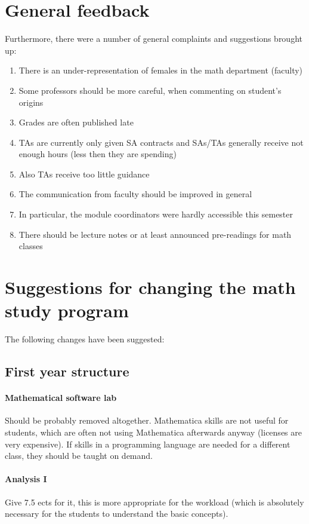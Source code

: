 \section{General feedback}
\label{sec-2}
\label{subsec:gen}
Furthermore, there were a number of general complaints and suggestions brought up:
\begin{enumerate}
\item There is an under-representation of females in the math department (faculty)
\item Some professors should be more careful, when commenting on student's origins
\item Grades are often published late
\item TAs are currently only given SA contracts and SAs/TAs generally receive not enough hours (less then they are spending)
\item Also TAs receive too little guidance
\item The communication from faculty should be improved in general
\item In particular, the module coordinators were hardly accessible this semester
\item There should be lecture notes or at least announced pre-readings for math classes
\end{enumerate}


\section{Suggestions for changing the math study program}
\label{sec-3}
\label{subsec:sug}
The following changes have been suggested:
\subsection{First year structure}
\label{sec-3-1}
\paragraph{Mathematical software lab} Should be probably removed altogether. Mathematica skills are not useful for students, which are often not using Mathematica afterwards anyway (licenses are very expensive). 
If skills in a programming language are needed for a different class, they should be taught on demand. 
\paragraph{Analysis I} Give 7.5 ects for it, this is more appropriate for the workload (which is absolutely necessary for the students to understand the basic concepts). 
